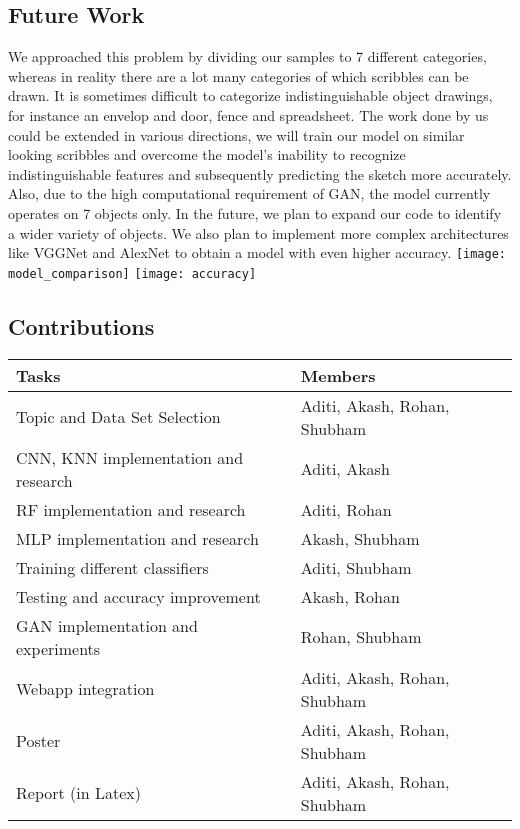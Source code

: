\documentclass{article} %
\begin{document}
\subsection{Future Work}
\smallskip
We approached this problem by dividing our samples to 7 different categories, whereas in reality there are a lot many categories of which scribbles can be drawn. It is sometimes difficult to categorize indistinguishable object drawings, for instance an envelop and door, fence and spreadsheet. The work done by us could be extended in various directions, we will train our model on similar looking scribbles and overcome the model's inability to recognize indistinguishable features and subsequently predicting the sketch more accurately.
Also, due to the high computational requirement of GAN, the model currently operates on 7 objects only. In the future, we plan to expand our code to identify a wider variety of objects. We also plan to implement more complex architectures like VGGNet and AlexNet to obtain a model with even higher accuracy. 
\bigskip
\texttt{[image: model\_comparison]}
\texttt{[image: accuracy]}
\bigskip

%
%

\subsection{Contributions}
\bigskip
\begin{center}
 \begin{tabular}{| p{7cm} | p{5cm} |} 
 \hline
 \textbf{Tasks} & \textbf{Members}\\
 \hline\hline
 Topic and Data Set Selection & Aditi, Akash, Rohan, Shubham\\ 
 \hline
 CNN, KNN implementation and research & Aditi, Akash \\
 \hline
 RF implementation and research & Aditi, Rohan\\
 \hline
 MLP implementation and research & Akash, Shubham\\
 \hline
 Training different classifiers & Aditi, Shubham\\
 \hline
 Testing and accuracy improvement & Akash,  Rohan\\
 \hline
 GAN implementation and experiments & Rohan, Shubham\\
 \hline
 Webapp integration & Aditi, Akash, Rohan, Shubham\\
 \hline
 Poster & Aditi, Akash, Rohan, Shubham\\
 \hline
 Report (in Latex) & Aditi, Akash, Rohan, Shubham\\
 \hline
\end{tabular}
\end{center}
\end{document}
